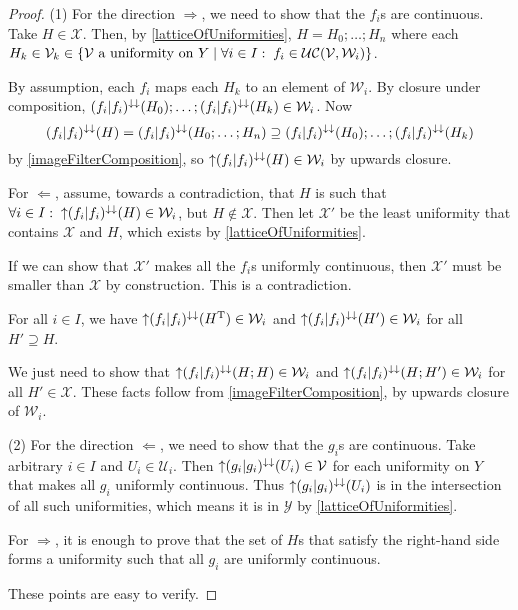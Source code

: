 \begin{proof}
(1) For the direction $\Rightarrow$, we need to show that the $f_i$s are continuous. Take $H\in \mathcal{X}$. Then, by \ref{latticeOfUniformities}, $H = H_0;\ldots;H_n$ where each $H_k\in \mathcal{V}_k \in \setbuilder{\text{$\mathcal{V}$ a uniformity on $Y$}}{\forall i\in I:\; f_i\in \ucont(\mathcal{V}, \mathcal{W}_i)}$.

By assumption, each $f_i$ maps each $H_k$ to an element of $\mathcal{W}_i$. By closure under composition, $(f_{i}|f_{i})^{\downarrow\downarrow}(H_0);\ldots;(f_{i}|f_{i})^{\downarrow\downarrow}(H_k)\in\mathcal{W}_i$. Now
\[ (f_i|f_i)^{\downarrow\downarrow}(H) = (f_i|f_i)^{\downarrow\downarrow}(H_0;\ldots; H_n) \supseteq (f_{i}|f_{i})^{\downarrow\downarrow}(H_0);\ldots;(f_{i}|f_{i})^{\downarrow\downarrow}(H_k) \]
by \ref{imageFilterComposition}, so $\operatorname{\uparrow} (f_i|f_i)^{\downarrow\downarrow}(H) \in \mathcal{W}_i$ by upwards closure.

For $\Leftarrow$, assume, towards a contradiction, that $H$ is such that $\forall i\in I: \; \operatorname{\uparrow}(f_i|f_i)^{\downarrow\downarrow}(H) \in \mathcal{W}_i$, but $H \notin \mathcal{X}$. Then let $\mathcal{X}'$ be the least uniformity that contains $\mathcal{X}$ and $H$, which exists by \ref{latticeOfUniformities}.

If we can show that $\mathcal{X}'$ makes all the $f_i$s uniformly continuous, then $\mathcal{X}'$ must be smaller than $\mathcal{X}$ by construction. This is a contradiction.

For all $i\in I$, we have $\operatorname{\uparrow}(f_i|f_i)^{\downarrow\downarrow}(H^{\mathrm{T}}) \in \mathcal{W}_i$ and $\operatorname{\uparrow}(f_i|f_i)^{\downarrow\downarrow}(H') \in \mathcal{W}_i$ for all $H'\supseteq H$.

We just need to show that $\operatorname{\uparrow}(f_i|f_i)^{\downarrow\downarrow}(H;H) \in \mathcal{W}_i$ and $\operatorname{\uparrow}(f_i|f_i)^{\downarrow\downarrow}(H;H') \in \mathcal{W}_i$ for all $H'\in \mathcal{X}$. These facts follow from \ref{imageFilterComposition}, by upwards closure of $\mathcal{W}_i$.

(2) For the direction $\Leftarrow$, we need to show that the $g_i$s are continuous. Take arbitrary $i\in I$ and $U_i\in \mathcal{U}_i$. Then $\operatorname{\uparrow} (g_i|g_i)^{\downarrow\downarrow}(U_i)\in \mathcal{V}$ for each uniformity on $Y$ that makes all $g_i$ uniformly continuous. Thus $\operatorname{\uparrow} (g_i|g_i)^{\downarrow\downarrow}(U_i)$ is in the intersection of all such uniformities, which means it is in $\mathcal{Y}$ by \ref{latticeOfUniformities}.

For $\Rightarrow$, it is enough to prove that the set of $H$s that satisfy the right-hand side forms a uniformity such that all $g_i$ are uniformly continuous.

These points are easy to verify.
\end{proof}
